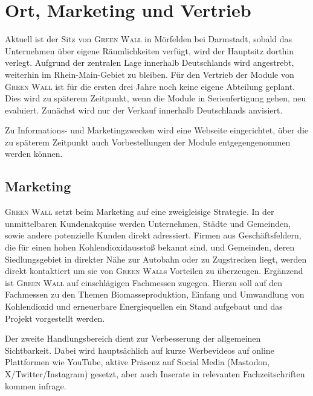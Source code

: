 \chapter{Ort, Marketing und Vertrieb}

Aktuell ist der Sitz von \textsc{Green Wall} in Mörfelden bei Darmstadt, sobald das Unternehmen über eigene Räumlichkeiten verfügt, wird der Hauptsitz dorthin verlegt.
Aufgrund der zentralen Lage innerhalb Deutschlands wird angestrebt, weiterhin im Rhein-Main-Gebiet zu bleiben.
Für den Vertrieb der Module von \textsc{Green Wall} ist für die ersten drei Jahre noch keine eigene Abteilung geplant.
Dies wird zu späterem Zeitpunkt, wenn die Module in Serienfertigung gehen, neu evaluiert.
Zunächst wird nur der Verkauf innerhalb Deutschlands anvisiert.


Zu Informations- und Marketingzwecken wird eine Webseite eingerichtet, über die zu späterem Zeitpunkt auch Vorbestellungen der Module entgegengenommen werden können.

    \section{Marketing}

        \textsc{Green Wall} setzt beim Marketing auf eine zweigleisige Strategie.
        In der unmittelbaren Kundenakquise werden Unternehmen, Städte und Gemeinden, sowie andere potenzielle Kunden direkt adressiert.
        Firmen aus Geschäftsfeldern, die für einen hohen Kohlendioxidausstoß bekannt sind, und Gemeinden, deren Siedlungsgebiet in direkter Nähe zur Autobahn oder zu Zugstrecken liegt, werden direkt kontaktiert um sie von \textsc{Green Wall}s Vorteilen zu überzeugen.
        Ergänzend ist \textsc{Green Wall} auf einschlägigen Fachmessen zugegen.
        Hierzu soll auf den Fachmessen zu den Themen Biomasseproduktion, Einfang und Umwandlung von Kohlendioxid und erneuerbare Energiequellen ein Stand aufgebaut und das Projekt vorgestellt werden.\par\medskip
        Der zweite Handlungsbereich dient zur Verbesserung der allgemeinen Sichtbarkeit.
        Dabei wird hauptsächlich auf kurze Werbevideos auf online Plattformen wie YouTube, aktive Präsenz auf Social Media (Mastodon, X/Twitter/Instagram) gesetzt, aber auch Inserate in relevanten Fachzeitschriften kommen infrage.

